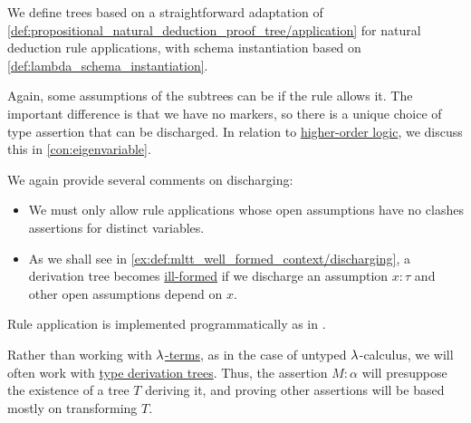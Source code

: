 \begin{definition}
\begin{thmenum}[resume=def:type_derivation_tree]
     We define  trees based on a straightforward adaptation of \cref{def:propositional_natural_deduction_proof_tree/application} for natural deduction rule applications, with schema instantiation based on \cref{def:lambda_schema_instantiation}.

    Again, some assumptions of the subtrees can be  if the rule allows it. The important difference is that we have no markers, so there is a unique choice of type assertion that can be discharged. In relation to \hyperref[def:higher_order_logic]{higher-order logic}, we discuss this in \cref{con:eigenvariable}.

    We again provide several comments on discharging:
    \begin{itemize}
      \item We must only allow rule applications whose open assumptions have no clashes assertions for distinct variables.

      \item As we shall see in \cref{ex:def:mltt_well_formed_context/discharging}, a derivation tree becomes \hyperref[rem:well_formed_context]{ill-formed} if we discharge an assumption \( x: \tau \) and other open assumptions depend on \( x \).
    \end{itemize}
  \end{thmenum}
\end{definition}
\begin{comments}
  \item Rule application is implemented programmatically as  in \cite{notebook:code}.
\end{comments}

\begin{remark}\label{rem:type_derivation_tree_focus}
  Rather than working with \hyperref[def:lambda_term]{\( {\mathrm \lambda} \)-terms}, as in the case of untyped \( {\mathrm \lambda} \)-calculus, we will often work with \hyperref[def:type_derivation_tree]{type derivation trees}. Thus, the assertion \( M: \alpha \) will presuppose the existence of a tree \( T \) deriving it, and proving other assertions will be based mostly on transforming \( T \).
\end{remark}

